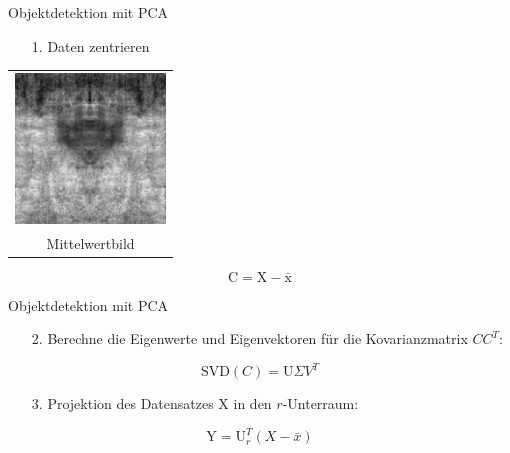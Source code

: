 \begin{frame}[t,fragile]{Objektdetektion mit PCA}
	\begin{itemize}
 \item[1. ]{Daten zentrieren}
  \end{itemize}
   
  \vspace{0.01em}
  {
\begin{table}
\centering
        \begin{tabular}{c}
        \includegraphics[width=4cm]{img/Segmentierung/PCA-mean}\\
        Mittelwertbild 
         \end{tabular}
        
\end{table}
 }
\begin{equation}
\text{C} = \text{X} - \bar{\text{x}}
\end{equation}
\end{frame}

\begin{frame}[t,fragile]{Objektdetektion mit PCA}
\begin{itemize}
 \item[2. ]{Berechne die Eigenwerte und Eigenvektoren für die Kovarianzmatrix ${CC^T}$:}
  \end{itemize}

   \begin{equation}
\text{SVD}(C) = \text{U} \Sigma V^T 
\end{equation}

	\begin{itemize}
 \item[3. ]{Projektion des Datensatzes X in den $r$-Unterraum:}
  \end{itemize}
   \begin{equation}
\text{Y}=\text{U}^{T}_{r}(X-\bar{x})
\end{equation}

\end{frame}


